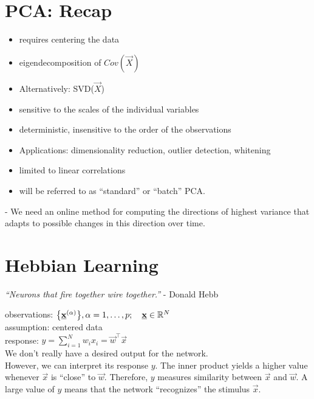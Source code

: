 
\section{PCA: Recap}

\begin{itemize}
\item requires centering the data
\item eigendecomposition of $Cov(\vec X)$
\item Alternatively: SVD($\vec X$)
\item sensitive to the scales of the individual variables
\item deterministic, insensitive to the order of the observations
\item Applications: dimensionality reduction, outlier detection, whitening
\item limited to linear correlations
\item will be referred to as ``standard'' or ``batch'' PCA.
\end{itemize}


- We need an online method for computing the directions of highest variance that adapts to possible changes in this direction over time.

\section{Hebbian Learning}

\begin{center}
\textit{``Neurons that fire together wire together.''} - Donald Hebb
\end{center}

observations: $\big\{ \underline{\mathbf{x}}^{(\alpha)} \big\}, \alpha = 1, \ldots, p; \quad \underline{\mathbf{x}} \in \mathbb{R}^N$\\

assumption: centered data\\

response: $y = \sum_{i=1}^{N} w_i x_i = \vec w^{\top} \vec x$\\

We don't really have a desired output for the network.\\
However, we can interpret its response $y$.
The inner product yields a higher value whenever $\vec x$ is ``close'' to $\vec w$.
Therefore, $y$ measures similarity between $\vec x$ and $\vec w$.
A large value of $y$ means that the network ``recognizes'' the stimulus $\vec x$.\\

